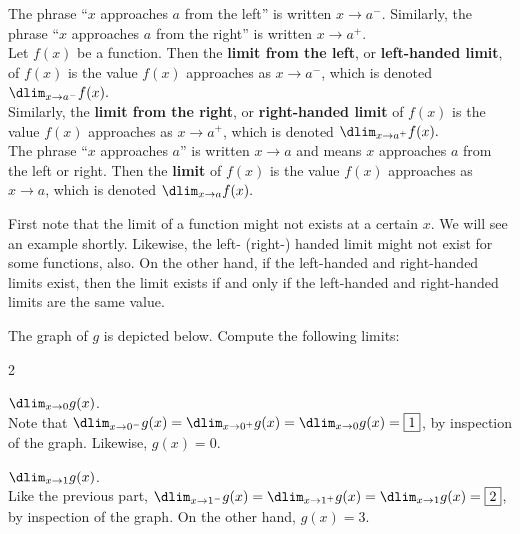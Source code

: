 \documentclass{book}
\begin{document}
\begin{Def} The phrase ``$x$ approaches $a$ from the left'' is written $x\to a^-$. Similarly, the phrase ``$x$ approaches $a$ from the right'' is written $x\to a^+$.\\
 Let $f(x)$ be a function. Then the \textbf{limit from the left}, or \textbf{left-handed limit}, of $f(x)$ is the value $f(x)$ approaches as $x\to a^-$, which is denoted $\dlim_{x\to a^-}f(x).$\\
  Similarly, the \textbf{limit from the right}, or \textbf{right-handed limit} of $f(x)$ is the value $f(x)$ approaches as $x\to a^+$, which is denoted $\dlim_{x\to a^+}f(x).$\\
The phrase ``$x$ approaches $a$'' is written $x\to a$ and means $x$ approaches $a$ from the left or right. Then the \textbf{limit} of $f(x)$ is the value $f(x)$ approaches as $x\to a$, which is denoted $\dlim_{x\to a}f(x).$
\end{Def}\vs

 First note that the limit of a function might not exists at a certain $x$. We will see an example shortly. Likewise, the left- (right-) handed limit might not exist for some functions, also. On the other hand, if the left-handed and right-handed limits exist, then the limit exists if and only if the left-handed and right-handed limits are the same value.

\begin{Exam} The graph of $g$ is depicted below. Compute the following limits:
\begin{enumerate}
\begin{multicols}{2}
\item $\dlim_{x\to 0} g(x)$.\\

Note that $\dlim_{x\to 0^-} g(x) = \dlim_{x\to 0^+} g(x) = \dlim_{x\to 0} g(x) = \fbox{$1$}$, by inspection of the graph. Likewise, $g(x) = 0$.\\

\item $\dlim_{x\to 1} g(x)$.\\

Like the previous part, $\dlim_{x\to 1^-} g(x) = \dlim_{x\to 1^+} g(x) = \dlim_{x\to 1} g(x) = \fbox{$2$}$, by inspection of the graph. On the other hand, $g(x) = 3$.\\

\begin{center}
\end{center}
\end{multicols}
\end{enumerate}
\end{Exam}\vs
\end{document}
